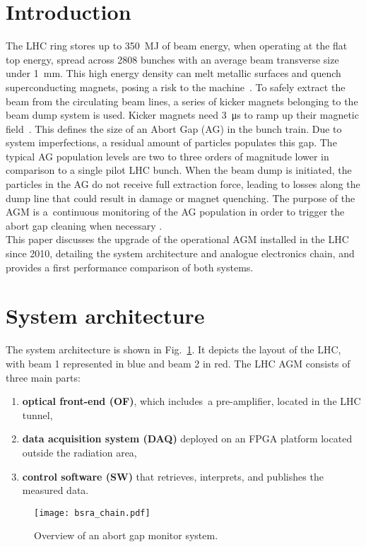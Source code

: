 \section{Introduction}
The LHC ring stores up to \SI{350}{MJ} of beam energy, when operating at the flat top energy, spread across 2808 bunches with an average beam transverse size under \SI{1}{mm}.
%
This high energy density can melt metallic surfaces and quench
superconducting magnets, posing a risk to the machine~\cite{LHC_report}.
%
To safely extract the beam from the circulating beam lines, a series of kicker magnets belonging to the beam dump system is used. 
%
Kicker magnets need \SI{3}{\micro\second} to ramp up their magnetic field~\cite{beam_dump_system}.
%
This defines the size of an Abort Gap (AG) in the bunch train.
%
Due to system imperfections, a residual amount of particles populates this gap.
%
The typical AG population levels are two to three orders of magnitude lower in comparison to a single pilot LHC bunch.
%
When the beam dump is initiated, the particles in the AG do not receive full
extraction force, leading to losses along the dump line that could result in damage or magnet quenching.
%
%
The purpose of the AGM is a~continuous monitoring of the AG population in order to trigger the abort gap cleaning when  necessary \cite{particles_in_ag} .
\\
This paper discusses the upgrade of the operational AGM installed in the LHC since 2010, detailing the system architecture and analogue electronics chain, and provides a first performance comparison  of both systems.

\section{System architecture}
The system architecture is shown in Fig.~\ref{fig:bsra_chain}.
%
It depicts the layout of the LHC, with beam 1 represented in blue and beam 2 in red.
%
The LHC AGM consists of three main parts:
%
\begin{enumerate}
    \item \textbf{optical front-end (OF)}, which includes~a pre-amplifier, located in the LHC tunnel,
    \item \textbf{data acquisition system (DAQ)} deployed on an FPGA platform located outside the radiation area,
    \item \textbf{control software (SW)} that retrieves, interprets, and publishes the measured data.
\end{enumerate}
%
\begin{figure}[!tbh]
    \centering
    \texttt{[image: bsra\_chain.pdf]}
    \caption{Overview of an abort gap monitor system.}
    \label{fig:bsra_chain}
\end{figure} 

